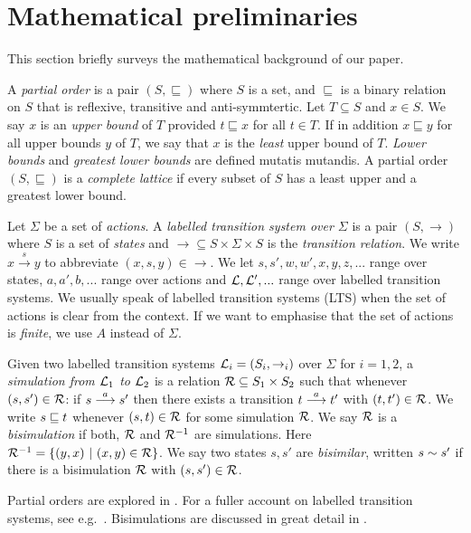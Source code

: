 \section{Mathematical preliminaries}\label{preliminaries}

\NI This section briefly surveys the mathematical background of our
paper.

\begin{definition}
A \emph{partial order} is a pair $(S, \sqsubseteq)$ where $S$ is a
set, and $\sqsubseteq$ is a binary relation on $S$ that is reflexive,
transitive and anti-symmtertic.  Let $T \subseteq S$ and $x \in S$. We
say $x$ is an \emph{upper bound} of $T$ provided $t \sqsubseteq x$ for
all $t \in T$. If in addition $x \sqsubseteq y$ for all upper bounds
$y$ of $T$, we say that $x$ is the \emph{least} upper bound of
$T$. \emph{Lower bounds} and \emph{greatest lower bounds} are defined
mutatis mutandis.  A partial order $(S, \sqsubseteq)$ is a
\emph{complete lattice} if every subset of $S$ has a least upper and a
greatest lower bound. 
\end{definition}

\begin{definition}
Let $\Sigma$ be a set of \emph{actions}.  A \emph{labelled transition
  system over $\Sigma$} is a pair $(S, \rightarrow)$ where $S$ is a
set of \emph{states} and $\rightarrow \subseteq S \times \Sigma \times
S$ is the \emph{transition relation}.  We write $x \xrightarrow{s} y$
to abbreviate $(x,s,y) \in \rightarrow$. We let $s, s', w, w', x, y,
z, ...$ range over states, $a, a', b, ...$ range over actions and
$\mathcal{L}, \mathcal{L}', ...$ range over labelled transition systems. We usually
speak of labelled transition systems (LTS) when the set of actions is
clear from the context. If we want to emphasise that the set of
actions is \emph{finite}, we use $A$ instead of $\Sigma$.
\end{definition}

\begin{definition}
Given two labelled transition systems $\mathcal{L}_i = (S_i, \rightarrow_i)$
over $\Sigma$ for $i = 1, 2$, a \emph{simulation from $\mathcal{L}_1$ to
  $\mathcal{L}_2$} is a relation $\mathcal{R} \subseteq S_1 \times S_2$ such that
whenever $(s, s') \in \mathcal{R}$: if $s \stackrel{a}{\longrightarrow} s'$ then there exists a
transition $t \stackrel{a}{\longrightarrow} t'$ with $(t, t') \in \mathcal{R}$.  We write $s \sqsubseteq
t$ whenever $(s, t) \in \mathcal{R}$ for some simulation $\mathcal{R}$.  We say
$\mathcal{R}$ is a \emph{bisimulation} if both, $\mathcal{R}$ and $\mathcal{R}^{-1}$ are
simulations. Here $\mathcal{R}^{-1} = \{(y, x)\ |\ (x, y) \in \mathcal{R}\}$.  We
say two states $s, s'$ are \emph{bisimilar}, written $s \sim s'$ if
there is a bisimulation $\mathcal{R}$ with $(s, s') \in \mathcal{R}$.
\end{definition}

\NI Partial orders are explored in \cite{DaveyBA:intlatao}. For a
fuller account on labelled transition systems, see
e.g.~\cite{SassoneV:modcontac,HennessyM:Algtheop}. Bisimulations are
discussed in great detail in \cite{SangiorgiD:intbisac}.
